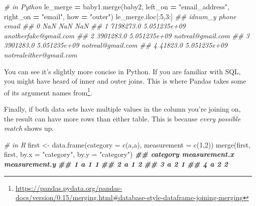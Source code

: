 \documentclass[
  12pt,
  krantz2]{krantz}
\makeatletter
\newenvironment{Shaded}{\begin{snugshade}}{\end{snugshade}}
\newcommand{\AttributeTok}[1]{\textcolor[rgb]{0.61,0.61,0.61}{#1}}
\newcommand{\CommentTok}[1]{\textcolor[rgb]{0.37,0.37,0.37}{\textit{#1}}}
\newcommand{\DecValTok}[1]{\textcolor[rgb]{0.06,0.06,0.06}{#1}}
\newcommand{\DocumentationTok}[1]{\textcolor[rgb]{0.37,0.37,0.37}{\textbf{\textit{#1}}}}
\newcommand{\FunctionTok}[1]{\textcolor[rgb]{0,0,0}{#1}}
\newcommand{\NormalTok}[1]{#1}
\newcommand{\OperatorTok}[1]{\textcolor[rgb]{0.43,0.43,0.43}{\textbf{#1}}}
\newcommand{\OtherTok}[1]{\textcolor[rgb]{0.37,0.37,0.37}{#1}}
\newcommand{\StringTok}[1]{\textcolor[rgb]{0.5,0.5,0.5}{#1}}
\renewcommand{\href}[2]{#2\footnote{\url{#1}}}
\newenvironment{kframe}{%
\medskip{}
\setlength{\fboxsep}{.8em}
 \def\at@end@of@kframe{}%
 \ifinner\ifhmode%
  \def\at@end@of@kframe{\end{minipage}}%
  \begin{minipage}{\columnwidth}%
 \fi\fi%
 \def\FrameCommand##1{\hskip\@totalleftmargin \hskip-\fboxsep
 \colorbox{shadecolor}{##1}\hskip-\fboxsep
     \hskip-\linewidth \hskip-\@totalleftmargin \hskip\columnwidth}%
 \MakeFramed {\advance\hsize-\width
   \@totalleftmargin\z@ \linewidth\hsize
   \@setminipage}}%
 {\par\unskip\endMakeFramed%
 \at@end@of@kframe}
\renewenvironment{Shaded}{\begin{kframe}}{\end{kframe}}
\makeatother
\begin{document}
\begin{Shaded}
\begin{Highlighting}[]
\CommentTok{\# in Python}
\NormalTok{le\_merge }\OperatorTok{=}\NormalTok{ baby1.merge(baby2, }
\NormalTok{                       left\_on }\OperatorTok{=} \StringTok{"email\_address"}\NormalTok{, right\_on }\OperatorTok{=} \StringTok{"email"}\NormalTok{, }
\NormalTok{                       how }\OperatorTok{=} \StringTok{"outer"}\NormalTok{)}
\NormalTok{le\_merge.iloc[:}\DecValTok{5}\NormalTok{,}\DecValTok{3}\NormalTok{:]}
\CommentTok{\#\#      idnum\_y         phone                    email}
\CommentTok{\#\# 0        NaN           NaN                      NaN}
\CommentTok{\#\# 1  7198273.0  5.051235e+09    anotherfake@gmail.com}
\CommentTok{\#\# 2  3901283.0  5.051235e+09        notreal@gmail.com}
\CommentTok{\#\# 3  3901283.0  5.051235e+09        notreal@gmail.com}
\CommentTok{\#\# 4    41823.0  5.051235e+09  notrealeither@gmail.com}
\end{Highlighting}
\end{Shaded}

You can see it's slightly more concise in Python. If you are familiar with SQL, you might have heard of inner and outer joins. This is where Pandas \href{https://pandas.pydata.org/pandas-docs/version/0.15/merging.html\#database-style-dataframe-joining-merging}{takes some of its argument names from}.

Finally, if both data sets have multiple values in the column you're joining on, the result can have more rows than either table. This is because \emph{every possible match} shows up.

\begin{Shaded}
\begin{Highlighting}[]
\CommentTok{\# in R}
\NormalTok{first }\OtherTok{\textless{}{-}} \FunctionTok{data.frame}\NormalTok{(}\AttributeTok{category =} \FunctionTok{c}\NormalTok{(}\StringTok{\textquotesingle{}a\textquotesingle{}}\NormalTok{,}\StringTok{\textquotesingle{}a\textquotesingle{}}\NormalTok{), }\AttributeTok{measurement =} \FunctionTok{c}\NormalTok{(}\DecValTok{1}\NormalTok{,}\DecValTok{2}\NormalTok{))}
\FunctionTok{merge}\NormalTok{(first, first, }\AttributeTok{by.x =} \StringTok{"category"}\NormalTok{, }\AttributeTok{by.y =} \StringTok{"category"}\NormalTok{)}
\DocumentationTok{\#\#   category measurement.x measurement.y}
\DocumentationTok{\#\# 1        a             1             1}
\DocumentationTok{\#\# 2        a             1             2}
\DocumentationTok{\#\# 3        a             2             1}
\DocumentationTok{\#\# 4        a             2             2}
\end{Highlighting}
\end{Shaded}
\end{document}
